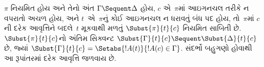 \begin{lem}
$\pi$ નિયમિત હોય અને તેનો અંત $\Gamma \Sequent \Delta$ હોય,
$c$ એ~$\pi$માં આઇગનચલ તરીકે ન વપરાતો અચળ હોય,
અને $t$~એ~$\pi$નું કોઈ આઇગનચલ ન ધરાવતું બંધ પદ હોય,
તો~$\pi$માં $c$ની દરેક આવૃત્તિને બદલે~$t$ મૂકવાથી મળતું
$\Subst{\pi}{t}{c}$ નિયમિત સાબિતી છે.
$\Subst{\pi}{t}{c}$નો અંતિમ સિક્વન્ટ
$\Subst{\Gamma}{t}{c} \Sequent \Subst{\Delta}{t}{c}$ છે,
જ્યાં $\Subst{\Gamma}{t}{c} =
\Setabs{!A(t)}{!A(c) \in \Gamma}$.
સંદર્ભો બહુગણો હોવાથી આ રૂપાંતરમાં દરેક આવૃત્તિ જળવાય છે.
\end{lem}

